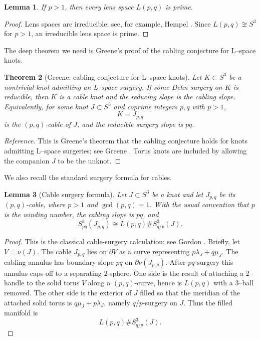 \documentclass[11pt]{article}
\newtheorem{theorem}{Theorem}
\newtheorem{lemma}[theorem]{Lemma}
\begin{document}
\begin{lemma}\label{lem:lens-prime}
If \(p>1\), then every lens space \(L(p,q)\) is prime.
\end{lemma}

\begin{proof}
Lens spaces are irreducible; see, for example, Hempel
\cite[Chapter~2]{Hempel}.  Since \(L(p,q)\not\cong S^3\) for \(p>1\), an
irreducible lens space is prime.
\end{proof}

The deep theorem we need is Greene's proof of the cabling conjecture for
L--space knots.

\begin{theorem}[Greene: cabling conjecture for L--space knots]
\label{thm:greene}
Let \(K \subset S^3\) be a nontrivial knot admitting an L--space surgery.  If
some Dehn surgery on \(K\) is reducible, then \(K\) is a cable knot and the
reducing slope is the cabling slope.  Equivalently, for some knot
\(J \subset S^3\) and coprime integers \(p,q\) with \(p>1\),
\[
K = J_{p,q}
\]
is the \((p,q)\)-cable of \(J\), and the reducible surgery slope is \(pq\).
\end{theorem}

\begin{proof}[Reference]
This is Greene's theorem that the cabling conjecture holds for knots admitting
L--space surgeries; see Greene \cite[Main Theorem and its cabling-conjecture
corollary]{Greene}.  Torus knots are included by allowing the companion \(J\)
to be the unknot.
\end{proof}

We also recall the standard surgery formula for cables.

\begin{lemma}[Cable surgery formula]\label{lem:cable}
Let \(J \subset S^3\) be a knot and let \(J_{p,q}\) be its \((p,q)\)-cable,
where \(p>1\) and \(\gcd(p,q)=1\).  With the usual convention that \(p\) is the
winding number, the cabling slope is \(pq\), and
\[
S^3_{pq}(J_{p,q}) \cong L(p,q) \# S^3_{q/p}(J).
\]
\end{lemma}

\begin{proof}
This is the classical cable-surgery calculation; see Gordon
\cite{Gor83}.  Briefly, let \(V=\nu(J)\).  The cable \(J_{p,q}\) lies on
\(\partial V\) as a curve representing \(p\lambda_J+q\mu_J\).  The cabling
annulus has boundary slope \(pq\) on \(\partial \nu(J_{p,q})\).  After
\(pq\)-surgery this annulus caps off to a separating \(2\)-sphere.  One side is
the result of attaching a 2--handle to the solid torus \(V\) along a
\((p,q)\)-curve, hence is \(L(p,q)\) with a 3--ball removed.  The other side is
the exterior of \(J\) filled so that the meridian of the attached solid torus
is \(q\mu_J+p\lambda_J\), namely \(q/p\)-surgery on \(J\).  Thus the filled
manifold is
\[
L(p,q)\# S^3_{q/p}(J).
\]
\end{proof}
\end{document}
